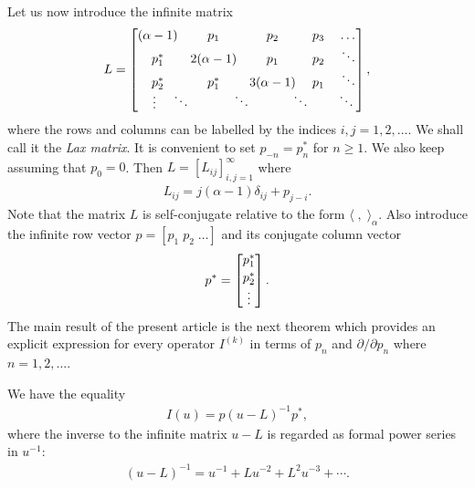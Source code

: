 Let us now introduce the inf\/inite matrix
\begin{gather}
\label{Lax_matrix}
L=
\begin{bmatrix}
(\alpha-1)&p_1&p_2&p_3&\hspace{-1pt}\ldots
\\
p_1^*&2(\alpha-1)&p_1&p_2&\ddots
\\
p_2^*&p_1^*&3(\alpha-1)&p_1&\ddots
\\[-2pt]
\raisebox{-1pt}{\vdots}\hspace{12pt}\ddots\hspace{-20pt}&\hspace{24pt}\ddots\hspace{-20pt}
&\hspace{24pt}\ddots\hspace{-20pt}&\hspace{24pt}\ddots\hspace{-20pt}
\end{bmatrix},
\end{gather}
where the rows and columns can be labelled by the indices $i,j=1,2,\ldots$.
We shall call it the \emph{Lax matrix}.
It is convenient to set $p_{-n}=p^{\ast}_n$ for $n\ge1$.
We also keep assuming that $p_{0}=0$.
Then $L=[ L_{ij}]_{i,j=1}^{\infty}$ where
\begin{gather}
\label{Ljk}
L_{ij}=j(\alpha-1)\delta_{ij}+p_{j-i}.
\end{gather}
Note that the matrix $L$ is self-conjugate relative to the form $\langle\; ,\; \rangle_\alpha$.
Also introduce the inf\/inite row vector $p=[p_1\; p_2\; \ldots]$ and its conjugate column vector
\begin{gather*}
p^{\ast}=
\begin{bmatrix}
p^{\ast}_1
\\[2pt]
p^{\ast}_2
\\[6pt]
\raisebox{0pt}[0pt][2pt]{\vdots}
\end{bmatrix}
.
\end{gather*}
The main result of the present article is the next theorem which provides an explicit expression for every
operator $I^{(k)}$ in terms of $p_n$ and $\partial /\partial  p_{n}$ where
$n=1,2,\ldots$.
\begin{theorem}\label{Theorem2}
We have the equality
\begin{gather}
\label{hua}
I(u)=p(u-L)^{-1}p^{\ast},
\end{gather}
where the inverse to the infinite matrix $u-L$ is regarded as formal power series in $u^{-1}$:
\begin{gather*}
(u-L)^{-1}=u^{-1}+Lu^{-2}+L^2u^{-3}+\cdots.
\end{gather*}
\end{theorem}

